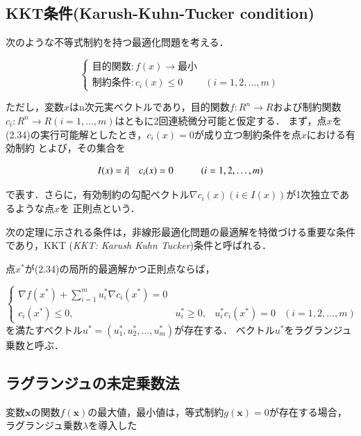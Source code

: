 \subsection{KKT条件(Karush-Kuhn-Tucker condition)}
次のような不等式制約を持つ最適化問題を考える．

\begin{equation}
    \left\{
        \begin{array}{cc}
            目的関数:f(x) \to 最小 & \\
            制約条件:c_i(x) \leq 0 & (i=1,2,\ldots,m)
        \end{array}
    \right.
\end{equation}

ただし，変数$x$はn次元実ベクトルであり，目的関数$f:R^n \to R$および制約関数
$c_i:R^n \to R(i=1,\ldots,m)$はともに2回連続微分可能と仮定する．
まず，点$x$を(2.34)の実行可能解としたとき，$c_i(x)=0$が成り立つ制約条件を点$x$における有効制約
とよび，その集合を

\begin{equation}
    I(x) = {i| \quad c_i(x)=0 \hspace{10mm} (i=1,2,\ldots,m)} \nonumber
\end{equation}

で表す．さらに，有効制約の勾配ベクトル$\nabla c_i(x)(i \in I(x))$が1次独立であるような点$x$を
正則点という．

次の定理に示される条件は，非線形最適化問題の最適解を特徴づける重要な条件であり，KKT
(\emph{KKT: Karush Kuhn Tucker})条件と呼ばれる．\cite{ibaragi}

点$x^*$が(2.34)の局所的最適解かつ正則点ならば，

\begin{equation}
    \left\{
        \begin{array}{cccc}
            \nabla f(x^*)+\sum_{i=1}^m u_i^*\nabla c_i(x^*)=0 & & & \\
            c_i(x^*)\leq0, & u_i^*\geq0, & u_i^*c_i(x^*)=0 & (i=1,2,\ldots,m)
        \end{array}
    \right.
\end{equation}
を満たすベクトル$u^*=(u_1^*,u_2^*,\ldots,u_m^*)$が存在する．
ベクトル$u^*$をラグランジュ乗数と呼ぶ．

\subsection{ラグランジュの未定乗数法}
変数$\bm{x}$の関数$f(\bm{x})$の最大値，最小値は，等式制約$g(\bm{x})=0$が存在する場合，
ラグランジュ乗数$\lambda$を導入した


